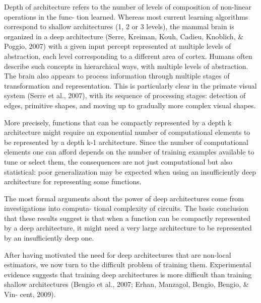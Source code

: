 \documentclass[cic,tc]{iiufrgs}
\begin{document}





Depth of architecture refers to the number of levels of composition of
non-linear operations in the func- tion learned.  Whereas most current learning
algorithms correspond to shallow architectures (1, 2 or 3 levels), the mammal
brain is organized in a deep architecture (Serre, Kreiman, Kouh, Cadieu,
Knoblich, \& Poggio, 2007) with a given input percept represented at multiple
levels of abstraction, each level corresponding to a different area of cortex.
Humans often describe such concepts in hierarchical ways, with multiple levels
of abstraction. The brain also appears to process information through multiple
stages of transformation and representation. This is particularly clear in the
primate visual system (Serre et al., 2007), with its sequence of processing
stages: detection of edges, primitive shapes, and moving up to gradually more
complex visual shapes.\cite{bengio2009learning}

More precisely, functions that can be compactly represented by a depth k
architecture might require an exponential number of computational elements to
be represented by a depth k-1 architecture. Since the number of
computational elements one can afford depends on the number of training
examples available to tune or select them, the consequences are not just
computational but also statistical: poor generalization may be expected when
using an insufficiently deep architecture for representing some
functions.\cite{bengio2009learning}

The most formal arguments about the power of deep architectures come from
investigations into computa- tional complexity of circuits. The basic
conclusion that these results suggest is that when a function can be
compactly represented by a deep architecture, it might need a very large
architecture to be represented by an insufficiently deep
one.\cite{bengio2009learning}

After having motivated the need for deep architectures that are non-local
estimators, we now turn to the difficult problem of training them.
Experimental evidence suggests that training deep architectures is more
difficult than training shallow architectures (Bengio et al., 2007; Erhan,
Manzagol, Bengio, Bengio, \& Vin- cent, 2009).\cite{bengio2009learning}
\end{document}
